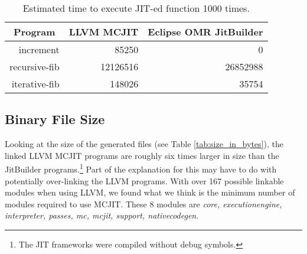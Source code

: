\begin{table*}[t]
  \begin{tabular}{|r|l|l|} 
  \hline
  \multicolumn{1}{|c|}{\textbf{Program}}
  & \multicolumn{1}{c|}{\textbf{LLVM MCJIT}}                      
  & \multicolumn{1}{c|}{\textbf{Eclipse OMR JitBuilder}}
  \\ \hline

  increment                               
  & \multicolumn{1}{r|}{\num{85250}} %
  & \multicolumn{1}{r|}{\num{0}}     %
  \\ \hline
  
  recursive-fib                           
  & \multicolumn{1}{r|}{\num{12126516}} %
  & \multicolumn{1}{r|}{\num{26852988}} %
  \\ \hline
  
  iterative-fib                           
  & \multicolumn{1}{r|}{\num{148026}} %
  & \multicolumn{1}{r|}{\num{35754}} %
  \\ \hline
  
\end{tabular}
  \caption{Estimated time to execute JIT-ed function 1000 times.}
  \label{tab:1k_executions}
\end{table*}


\subsection{Binary File Size}
Looking at the size of the generated files (see Table \ref{tab:size_in_bytes}), the linked LLVM MCJIT programs are roughly six times larger in size than the JitBuilder programs.\footnote{The JIT frameworks were compiled without debug symbols.}
Part of the explanation for this may have to do with potentially over-linking the LLVM programs.
With over 167 possible linkable modules when using LLVM, we found what we think is the minimum number of modules required to use MCJIT.
These 8 modules are \textit{core, executionengine, interpreter, passes, mc, mcjit, support, nativecodegen}.

